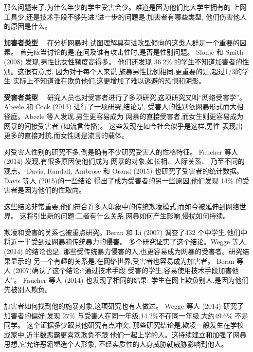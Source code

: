 \documentclass[a4paper]{article}
\begin{document}
那么问题来了:为什么年少的学生受害会少。难道是因为他们比大学生拥有的
上网工具少,还是技术手段不够先进?进一步的问题是:加害者有哪些类型,
他们伤害他人的原因是什么。

\textbf{加害者类型}~~
在分析网暴时,试图理解具有进攻型倾向的这类人群是一个重要的因素。
首先应当讨论的是,在问及谁有攻击性时,是否是性别问题。
Slonje 和 Smith (2008) \cite{slonje2008}发现,男性比女性频度高得多。
他们还发现 36.2\% 的学生不知道加害者的性别。这很有意思,
因为对于每个人来说,施暴男性比例相同,更重要的是,超过1/3的学生
实际上不知道谁在欺负他们,这更增加了难以逃避的恐惧和阴影。

\textbf{受害者类型}~~
研究人员也对受害者进行了多项研究,这项研究又叫``网络受害学''。
Abeele 和 Cock (2013)\cite{abeele2013} 进行了一项研究,结论是,
受害人的性别依网暴形式而大相径庭。Abeele 等人发现,男生更容易成为
网暴的直接受害者,而女生则更容易成为网暴的间接受害者 (如流言传播)。
这些发现在如今社会似乎是这样,男性
表现出更多的直接对抗,而女性则是流言的载体。

对受害人性别的研究不多,倒是确有不少研究受害人的性格特征。
Faucher 等人 (2014)\cite{faucher2014} 发现,有很多原因使他们成为
网暴的对象,如长相、人际关系、 乃至不同的观点。
Davis, Randall, Ambrose 和 Orand (2015)\cite{davis2015}
也研究了受害者的统计数据。Davis 等人 (2015)\cite{davis2015}的一些结论
得出了成为受害者的另一些原因,他们发现 14\% 的受害者是因为他们的性取向。

这些结论非常重要,他们符合许多人印象中的传统欺凌模式,而如今被延伸到网络世界。
这将引出新的问题:二者有什么关系,网暴如何产生影响,侵扰如何持续。

欺凌和受害的关系也被重点研究。Beran 和 Li (2007)\cite{beran2007}
调查了432 个中学生,他们中将近一半受到过网暴和传统暴力的侵害。
多个研究证实了这个结论。Wegge 等人 (2014)\cite{wegge2014} 的结论也是,
那些受传统暴力侵害的人,也更容易成为网暴的受害者。研究结果显示的
另一个有趣的关系是,在网络世界,受害者也容易成为加害者。
Beran 等人 (2007)\cite{beran2007}确认了这个结论:``通过技术手段
受害的学生,容易使用技术手段加害他人''。
Faucher 等人 (2014)\cite{faucher2014} 也发现了相同的结果:
学生在网上欺负别人,是因为他们先被别人欺负。

加害者如何找到他的施暴对象,这项研究也有人做过。
Wegge 等人 (2014)\cite{wegge2014} 研究了加害者的偏好,发现 27\%
与受害人在同一年级,14.2\%不在同一年级,大约49.6\% 不是同学。
这个证据多少跟其他研究有点冲突,
那些研究结论是,欺凌一般发生在学校或家中,近半数恶霸更喜欢欺负不跟
他们一起上学的人。这持续建立和加强了网暴思想,它允许恶霸塑造个人形象,
不经实质性的人身威胁就威胁影响到他人。
\end{document}
